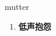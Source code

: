 
\begin{frame}
{\huge mutter}
\begin{center}
\begin{enumerate}\Large
  \item \textbf{低声抱怨}
\end{enumerate}
\end{center}
\end{frame}
